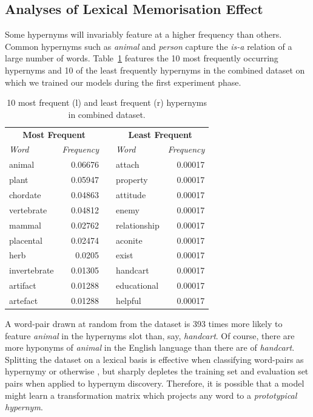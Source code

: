 \subsection{Analyses of Lexical Memorisation Effect}
Some hypernyms will invariably feature at a higher frequency than others.  Common hypernyms such as \textit{animal} and \textit{person} capture the \textit{is-a} relation of a large number of words.  Table~\ref{tab:high_freq_hyper_combined_set} features the 10 most frequently occurring hypernyms and 10 of the least frequently hypernyms in the combined dataset on which we trained our models during the first experiment phase.
\begin{table}\centering
    \begin{tabular}{@{}lrclr@{}} \toprule
    \multicolumn{2}{c}{\textbf{Most Frequent}} & \phantom{a} & \multicolumn{2}{c}{\textbf{Least Frequent}}\\
    \textit{Word} & \textit{Frequency} && \textit{Word} & \textit{Frequency} \\ 
    \cmidrule{1-2} \cmidrule{4-5}
    animal & 0.06676 && attach & 0.00017 \\
    plant & 0.05947 && property & 0.00017\\
    chordate & 0.04863 && attitude & 0.00017\\
    vertebrate & 0.04812 && enemy & 0.00017\\
    mammal & 0.02762 && relationship & 0.00017\\
    placental & 0.02474 && aconite & 0.00017\\
    herb & 0.0205 && exist & 0.00017\\
    invertebrate & 0.01305 && handcart & 0.00017\\
    artifact & 0.01288 && educational & 0.00017\\
    artefact & 0.01288 && helpful & 0.00017\\
    \bottomrule
    \end{tabular}
    \caption{10 most frequent (l) and least frequent (r) hypernyms in combined dataset.}\label{tab:high_freq_hyper_combined_set}
\end{table}
A word-pair drawn at random from the dataset is 393 times more likely to feature \textit{animal} in the hypernyms slot than, say, \textit{handcart}.  Of course, there are more hyponyms of \textit{animal} in the English language than there are of \textit{handcart}.  Splitting the dataset on a lexical basis is effective when classifying word-pairs as hypernymy or otherwise \citep{shwartz2017siege, levy2015supervised, santus2016nine}, but sharply depletes the training set and evaluation set pairs when applied to hypernym discovery.  Therefore, it is possible that a model might learn a transformation matrix which projects any word to a \textit{prototypical hypernym}.

